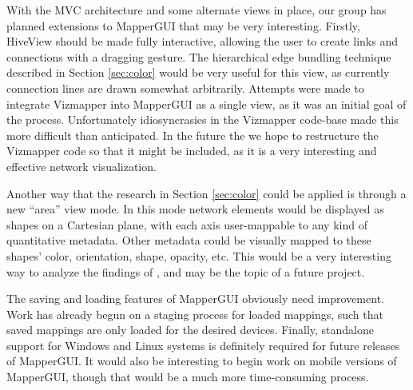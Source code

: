 With the MVC architecture and some alternate views in place, our group has planned extensions to MapperGUI that may be very interesting. Firstly, HiveView should be made fully interactive, allowing the user to create links and connections with a dragging gesture. The hierarchical edge bundling technique described in Section \ref{sec:color} would be very useful for this view, as currently connection lines are drawn somewhat arbitrarily. Attempts were made to integrate Vizmapper into MapperGUI as a single view, as it was an initial goal of the process. Unfortunately idiosyncrasies in the Vizmapper code-base made this more difficult than anticipated. In the future the we hope to restructure the Vizmapper code so that it might be included, as it is a very interesting and effective network visualization. 

Another way that the research in Section \ref{sec:color} could be applied is through a new ``area'' view mode. In this mode network elements would be displayed as shapes on a Cartesian plane, with each axis user-mappable to any kind of quantitative metadata. Other metadata could be visually mapped to these shapes' color, orientation, shape, opacity, etc. This would be a very interesting way to analyze the findings of , and may be the topic of a future project. 

The saving and loading features of MapperGUI obviously need improvement. Work has already begun on a staging process for loaded mappings, such that saved mappings are only loaded for the desired devices. Finally, standalone support for Windows and Linux systems is definitely required for future releases of MapperGUI. It would also be interesting to begin work on mobile versions of MapperGUI, though that would be a much more time-consuming process. 



	